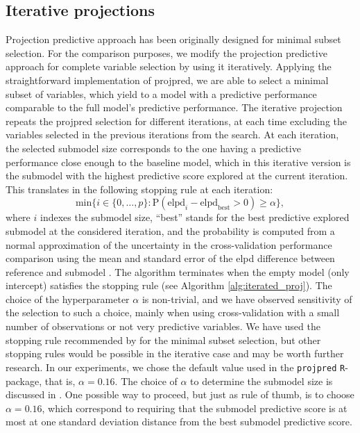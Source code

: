 \documentclass[a4]{article}
\theoremstyle{definition}
\begin{document}
\subsection{Iterative projections}

Projection predictive approach has been originally designed for minimal subset selection. For the comparison purposes, 
we modify the projection predictive approach for complete variable
selection by using it iteratively.  Applying the straightforward
implementation of projpred, we are able to select a minimal subset of
variables, which yield to a model with a predictive performance
comparable to the full model's predictive performance. 
 The iterative projection repeats
the projpred selection for different iterations, at each time
excluding the variables selected in the previous
iterations from the search.
 At each iteration, the selected submodel size corresponds to the
one having a predictive performance close enough to the baseline
model, which in this iterative version is the submodel with the
highest predictive score explored at the current iteration. This translates
in the following stopping rule at each iteration:
\begin{equation} 
\label{eq:rule_of_thumb}
\text{min} \{i\in \{0,\ldots,p\}: \text{P}(\text{elpd}_{i}-\text{elpd}_{\text{best}}>0)\geq \alpha \},
\end{equation}
where $i$ indexes the submodel size, ``best'' stands for the best predictive explored submodel
at the considered iteration, and the probability is computed from a normal approximation of the uncertainty in the cross-validation performance comparison using the mean and standard error of the elpd difference between reference and submodel \citep{Vehtari+etal:2017:practical,paper:projpred,Sivula+etal:2020:loo_uncertainty}. The algorithm terminates when the empty model (only intercept) satisfies
the stopping rule (see Algorithm \ref{alg:iterated_proj}).
The choice of the hyperparameter $\alpha$ is non-trivial, and we have 
observed sensitivity of the selection to such a choice, mainly when using cross-validation with a small
number of observations or not very predictive variables. We have used the stopping rule recommended by \citet{paper:projpred} for the minimal subset selection, but other stopping rules would be possible in the iterative case and may be worth further research.
In our experiments, we chose the default value used in the \texttt{projpred} 
\texttt{R}-package, that is, $\alpha=0.16$. The choice of $\alpha$ to determine 
the submodel size is discussed in \cite{paper:projpred}. One possible way to proceed, 
but just as rule of thumb, is to choose $\alpha = 0.16$, which correspond to requiring 
that the submodel predictive score is at most at one standard deviation distance 
from the best submodel predictive score.
\end{document}
